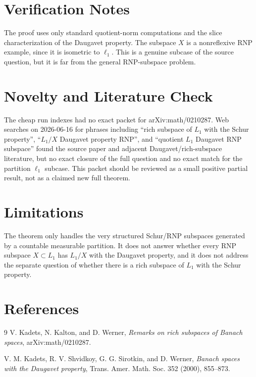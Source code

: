 \documentclass[11pt]{article}
\begin{document}
\section*{Verification Notes}

The proof uses only standard quotient-norm computations and the slice characterization of the Daugavet property.  The subspace \(X\) is a nonreflexive RNP example, since it is isometric to \(\ell_1\).  This is a genuine subcase of the source question, but it is far from the general RNP-subspace problem.

\section*{Novelty and Literature Check}

The cheap run indexes had no exact packet for arXiv:math/0210287.  Web searches on 2026-06-16 for phrases including ``rich subspace of \(L_1\) with the Schur property'', ``\(L_1/X\) Daugavet property RNP'', and ``quotient \(L_1\) Daugavet RNP subspace'' found the source paper and adjacent Daugavet/rich-subspace literature, but no exact closure of the full question and no exact match for the partition \(\ell_1\) subcase.  This packet should be reviewed as a small positive partial result, not as a claimed new full theorem.

\section*{Limitations}

The theorem only handles the very structured Schur/RNP subspaces generated by a countable measurable partition.  It does not answer whether every RNP subspace \(X\subset L_1\) has \(L_1/X\) with the Daugavet property, and it does not address the separate question of whether there is a rich subspace of \(L_1\) with the Schur property.

\section*{References}

\begin{thebibliography}{9}
V. Kadets, N. Kalton, and D. Werner,
\emph{Remarks on rich subspaces of Banach spaces},
arXiv:math/0210287.

V. M. Kadets, R. V. Shvidkoy, G. G. Sirotkin, and D. Werner,
\emph{Banach spaces with the Daugavet property},
Trans. Amer. Math. Soc. 352 (2000), 855--873.
\end{thebibliography}
\end{document}
